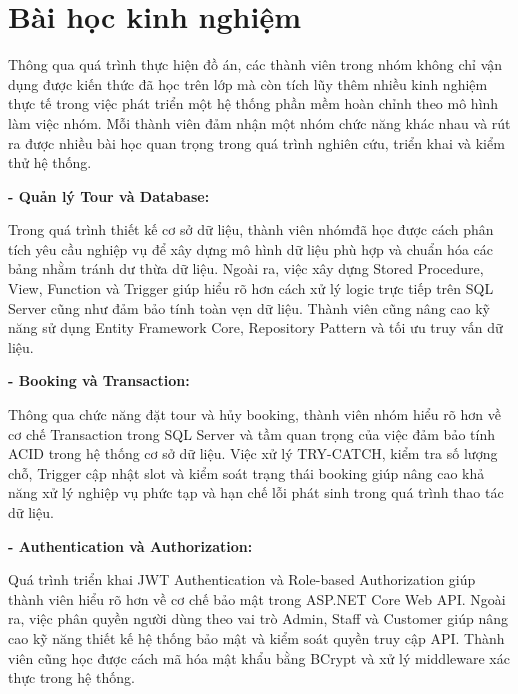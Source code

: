 
\section{Bài học kinh nghiệm}\label{Sec5.5}

Thông qua quá trình thực hiện đồ án, các thành viên trong nhóm không chỉ
vận dụng được kiến thức đã học trên lớp mà còn tích lũy thêm nhiều kinh nghiệm
thực tế trong việc phát triển một hệ thống phần mềm hoàn chỉnh theo mô hình
làm việc nhóm. Mỗi thành viên đảm nhận một nhóm chức năng khác nhau và rút ra
được nhiều bài học quan trọng trong quá trình nghiên cứu, triển khai và kiểm thử hệ thống.

\vspace{0.5cm}

\noindent\textbf{- Quản lý Tour và Database:}

Trong quá trình thiết kế cơ sở dữ liệu, thành viên nhómđã học được cách
phân tích yêu cầu nghiệp vụ để xây dựng mô hình dữ liệu phù hợp và chuẩn hóa
các bảng nhằm tránh dư thừa dữ liệu. Ngoài ra, việc xây dựng Stored Procedure,
View, Function và Trigger giúp hiểu rõ hơn cách xử lý logic trực tiếp trên
SQL Server cũng như đảm bảo tính toàn vẹn dữ liệu. Thành viên cũng nâng cao
kỹ năng sử dụng Entity Framework Core, Repository Pattern và tối ưu truy vấn dữ liệu.

\vspace{0.5cm}

\noindent\textbf{- Booking và Transaction:}

Thông qua chức năng đặt tour và hủy booking, thành viên nhóm hiểu rõ hơn
về cơ chế Transaction trong SQL Server và tầm quan trọng của việc đảm bảo tính
ACID trong hệ thống cơ sở dữ liệu. Việc xử lý TRY-CATCH, kiểm tra số lượng chỗ,
Trigger cập nhật slot và kiểm soát trạng thái booking giúp nâng cao khả năng
xử lý nghiệp vụ phức tạp và hạn chế lỗi phát sinh trong quá trình thao tác dữ liệu.

\vspace{0.5cm}

\noindent\textbf{- Authentication và Authorization:}

Quá trình triển khai JWT Authentication và Role-based Authorization giúp thành viên
hiểu rõ hơn về cơ chế bảo mật trong ASP.NET Core Web API. Ngoài ra, việc phân quyền
người dùng theo vai trò Admin, Staff và Customer giúp nâng cao kỹ năng thiết kế hệ thống
bảo mật và kiểm soát quyền truy cập API. Thành viên cũng học được cách mã hóa mật khẩu
bằng BCrypt và xử lý middleware xác thực trong hệ thống.

